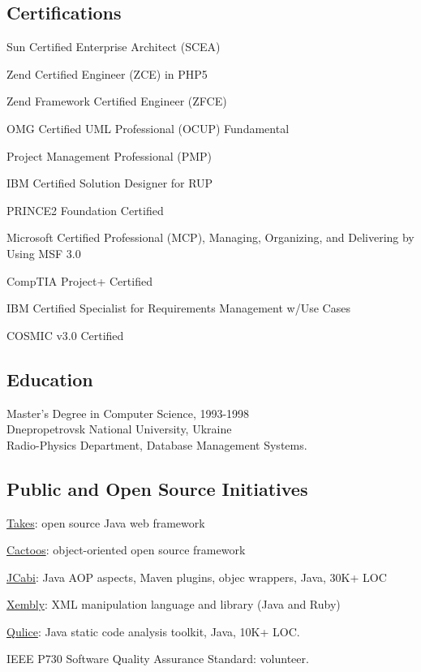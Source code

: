 \documentclass[12pt]{article}
\begin{document}
\subsection*{Certifications}

Sun Certified Enterprise Architect (SCEA)

Zend Certified Engineer (ZCE) in PHP5

Zend Framework Certified Engineer (ZFCE)

OMG Certified UML Professional (OCUP) Fundamental

Project Management Professional (PMP)

IBM Certified Solution Designer for RUP

PRINCE2 Foundation Certified

Microsoft Certified Professional (MCP), Managing, Organizing, and Delivering by Using MSF 3.0

CompTIA Project+ Certified

IBM Certified Specialist for Requirements Management w/Use Cases

COSMIC v3.0 Certified

\subsection*{Education}

Master's Degree in Computer Science, 1993-1998\\
Dnepropetrovsk National University, Ukraine\\
Radio-Physics Department, Database Management Systems.

\subsection*{Public and Open Source Initiatives}

\href{http://www.takes.org}{Takes}: open source Java web framework

\href{http://www.cactoos.org}{Cactoos}: object-oriented open source framework

\href{http://www.jcabi.com}{JCabi}: Java AOP aspects, Maven plugins, objec wrappers, Java, 30K+ LOC

\href{http://www.xembly.org}{Xembly}: XML manipulation language and library (Java and Ruby)

\href{http://www.qulice.com}{Qulice}: Java static code analysis toolkit, Java, 10K+ LOC.

IEEE P730 Software Quality Assurance Standard: volunteer.
\end{document}
